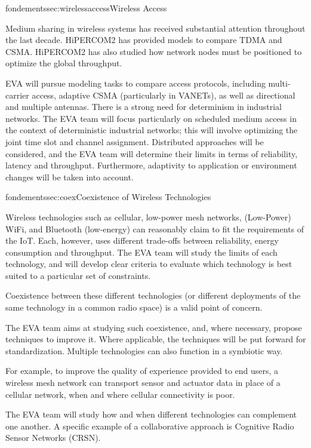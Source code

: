 \documentclass{ra2016}
\begin{document}
\begin{module}{fondements}{sec:wirelessaccess}{Wireless Access}

Medium sharing in wireless systems has received substantial attention throughout the last decade.
HiPERCOM2 has provided models to compare TDMA and CSMA.
HiPERCOM2 has also studied how network nodes must be positioned to optimize the global throughput.

EVA will pursue modeling tasks to compare access protocols, including multi-carrier access, adaptive CSMA (particularly in VANETs), as well as directional and multiple antennas.
There is a strong need for determinism in industrial networks.
The EVA team will focus particularly on scheduled medium access in the context of deterministic industrial networks; this will involve optimizing the joint time slot and channel assignment.
Distributed approaches will be considered, and the EVA team will determine their limits in terms of reliability, latency and throughput.
Furthermore, adaptivity to application or environment changes will be taken into account.

\end{module}

\begin{module}{fondements}{sec:coex}{Coexistence of Wireless Technologies}

Wireless technologies such as cellular, low-power mesh networks, (Low-Power) WiFi, and Bluetooth (low-energy) can reasonably claim to fit the requirements of the IoT.
Each, however, uses different trade-offs between reliability, energy consumption and throughput.
The EVA team will study the limits of each technology, and will develop clear criteria to evaluate which technology is best suited to a particular set of constraints.

Coexistence between these different technologies (or different deployments of the same technology in a common radio space) is a valid point of concern.

The EVA team aims at studying such coexistence, and, where necessary, propose techniques to improve it.
Where applicable, the techniques will be put forward for standardization.
Multiple technologies can also function in a symbiotic way.

For example, to improve the quality of experience provided to end users, a wireless mesh network can transport sensor and actuator data in place of a cellular network, when and where cellular connectivity is poor.

The EVA team will study how and when different technologies can complement one another.
A specific example of a collaborative approach is Cognitive Radio Sensor Networks (CRSN).

\end{module}
\end{document}
